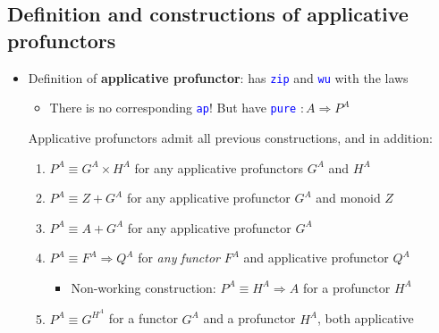 \subsection{Definition and constructions of applicative profunctors}
\begin{itemize}
\item Definition of \textbf{applicative profunctor}: has \texttt{\textcolor{blue}{\footnotesize{}zip}}
and \texttt{\textcolor{blue}{\footnotesize{}wu}} with the laws
\begin{itemize}
\item There is no corresponding \texttt{\textcolor{blue}{\footnotesize{}ap}}!
But have \texttt{\textcolor{blue}{\footnotesize{}pure}} {\footnotesize{}$:A\Rightarrow P^{A}$} 
\end{itemize}
Applicative profunctors admit all previous constructions, and in addition:
\begin{enumerate}
\item $P^{A}\equiv G^{A}\times H^{A}$ for any applicative profunctors $G^{A}$
and $H^{A}$
\item $P^{A}\equiv Z+G^{A}$ for any applicative profunctor $G^{A}$ and
monoid $Z$
\item $P^{A}\equiv A+G^{A}$ for any applicative profunctor $G^{A}$
\item $P^{A}\equiv F^{A}\Rightarrow Q^{A}$ for \emph{any} \emph{functor}
$F^{A}$ and applicative profunctor $Q^{A}$
\begin{itemize}
\item Non-working construction: $P^{A}\equiv H^{A}\Rightarrow A$ for a
profunctor $H^{A}$
\end{itemize}
\item $P^{A}\equiv G^{H^{A}}$ for a functor $G^{A}$ and a profunctor $H^{A}$,
both applicative
\end{enumerate}
\end{itemize}


